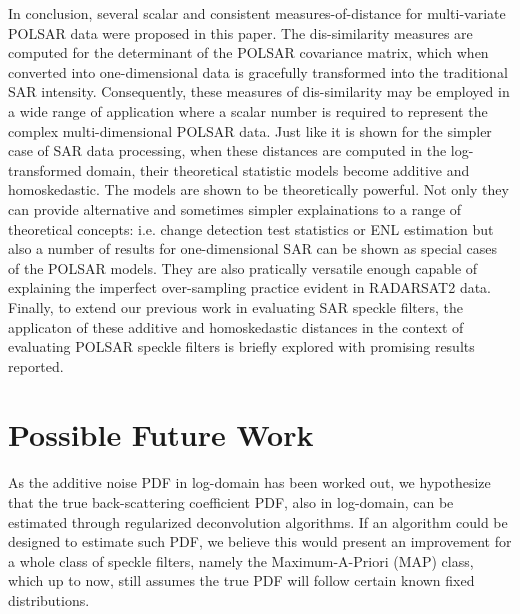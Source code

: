 In conclusion, several scalar and consistent measures-of-distance for multi-variate POLSAR data were proposed in this paper.
The dis-similarity measures are computed for the determinant of the POLSAR covariance matrix,
  which when converted into one-dimensional data
  is gracefully transformed into the traditional SAR intensity.
Consequently, these measures of dis-similarity may be employed in a wide range of application
  where a scalar number is required to represent the complex multi-dimensional POLSAR data.
Just like it is shown for the simpler case of SAR data processing\cite{Le_2010_ACRS},
  when these distances are computed in the log-transformed domain,
  their theoretical statistic models become additive and homoskedastic.
The models are shown to be theoretically powerful.
Not only they can provide alternative and sometimes simpler explainations to a range of theoretical concepts:
  i.e. change detection test statistics or ENL estimation
but also a number of results for one-dimensional SAR can be shown as special cases of the POLSAR models.
They are also pratically versatile enough
  capable of explaining the imperfect over-sampling practice evident in RADARSAT2 data.
Finally, to extend our previous work in evaluating SAR speckle filters,
  the applicaton of these additive and homoskedastic distances in the context of evaluating POLSAR speckle filters is briefly explored
  with promising results reported.
        

\section{Possible Future Work}
\label{sec:conclusion_future_work}

As the additive noise PDF in log-domain has been worked out, we hypothesize that the true back-scattering coefficient PDF, also in log-domain, can be estimated through regularized deconvolution algorithms.
If an algorithm could be designed to estimate such PDF, we believe this would present an improvement for a whole class of speckle filters, namely the Maximum-A-Priori (MAP) class, which up to now, still assumes the true PDF will follow certain known fixed distributions.

